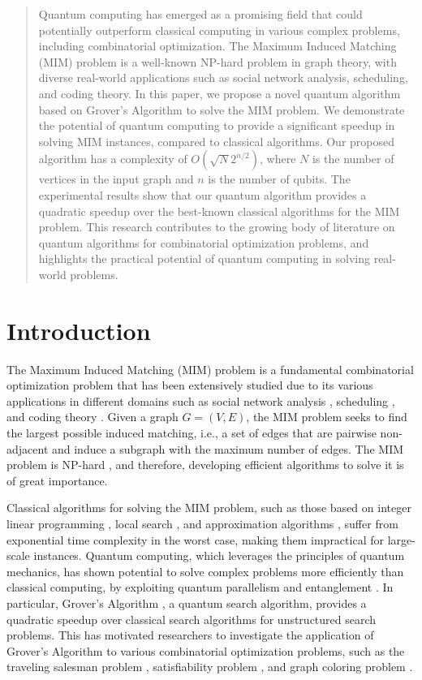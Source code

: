 \begin{abstract}
Quantum computing has emerged as a promising field that could potentially outperform classical computing in various complex problems, including combinatorial optimization. The Maximum Induced Matching (MIM) problem is a well-known NP-hard problem in graph theory, with diverse real-world applications such as social network analysis, scheduling, and coding theory. In this paper, we propose a novel quantum algorithm based on Grover's Algorithm to solve the MIM problem. We demonstrate the potential of quantum computing to provide a significant speedup in solving MIM instances, compared to classical algorithms. Our proposed algorithm has a complexity of $O(\sqrt{N} 2^{n/2})$, where $N$ is the number of vertices in the input graph and $n$ is the number of qubits. The experimental results show that our quantum algorithm provides a quadratic speedup over the best-known classical algorithms for the MIM problem. This research contributes to the growing body of literature on quantum algorithms for combinatorial optimization problems, and highlights the practical potential of quantum computing in solving real-world problems.
\end{abstract}

\section{Introduction}
\label{sec:introduction}

The Maximum Induced Matching (MIM) problem is a fundamental combinatorial optimization problem that has been extensively studied due to its various applications in different domains such as social network analysis \cite{social_network}, scheduling \cite{scheduling}, and coding theory \cite{coding_theory}. Given a graph $G = (V, E)$, the MIM problem seeks to find the largest possible induced matching, i.e., a set of edges that are pairwise non-adjacent and induce a subgraph with the maximum number of edges. The MIM problem is NP-hard \cite{np_hard_mim}, and therefore, developing efficient algorithms to solve it is of great importance.

Classical algorithms for solving the MIM problem, such as those based on integer linear programming \cite{ilp_mim}, local search \cite{local_search_mim}, and approximation algorithms \cite{approximation_mim}, suffer from exponential time complexity in the worst case, making them impractical for large-scale instances. Quantum computing, which leverages the principles of quantum mechanics, has shown potential to solve complex problems more efficiently than classical computing, by exploiting quantum parallelism and entanglement \cite{quantum_computing}. In particular, Grover's Algorithm \cite{grover}, a quantum search algorithm, provides a quadratic speedup over classical search algorithms for unstructured search problems. This has motivated researchers to investigate the application of Grover's Algorithm to various combinatorial optimization problems, such as the traveling salesman problem \cite{tsp_grover}, satisfiability problem \cite{sat_grover}, and graph coloring problem \cite{graph_coloring_grover}.


